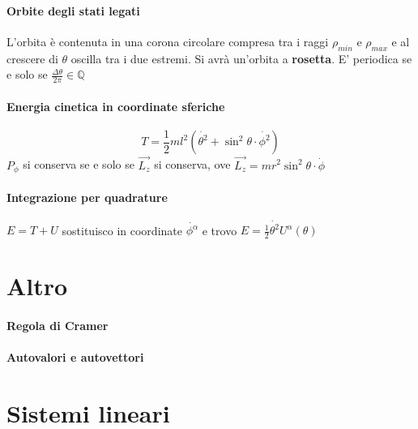 \documentclass[a4paper,12pt]{article}
\begin{document}
\paragraph{Orbite degli stati legati}
L'orbita è contenuta in una corona circolare compresa tra i raggi $\rho_{min}$ e $\rho_{max}$ e al crescere di $\theta$ oscilla tra i due estremi. Si avrà un'orbita a \textbf{rosetta}. E' periodica se e solo se $\frac{\Delta\theta}{2\pi}\in\mathbb{Q}$
\paragraph{Energia cinetica in coordinate sferiche}
\begin{displaymath}
T=\frac{1}{2}ml^2(\dot{\theta^2}+\sin^2\theta \cdot \dot{\phi^2})
\end{displaymath}
$P_{\phi}$ si conserva se e solo se $\vec{L_z}$ si conserva, ove $\vec{L_z}=mr^2\sin^2\theta\cdot\dot{\phi}$
\paragraph{Integrazione per quadrature}
$E=T+U$ sostituisco in coordinate $\dot{\phi^{\alpha}}$ e trovo $E=\frac{1}{2}\dot{\theta^2}U^{\alpha}(\theta)$

\section{Altro}
\paragraph{Regola di Cramer}
\paragraph{Autovalori e autovettori}

\section{Sistemi lineari}
\end{document}
